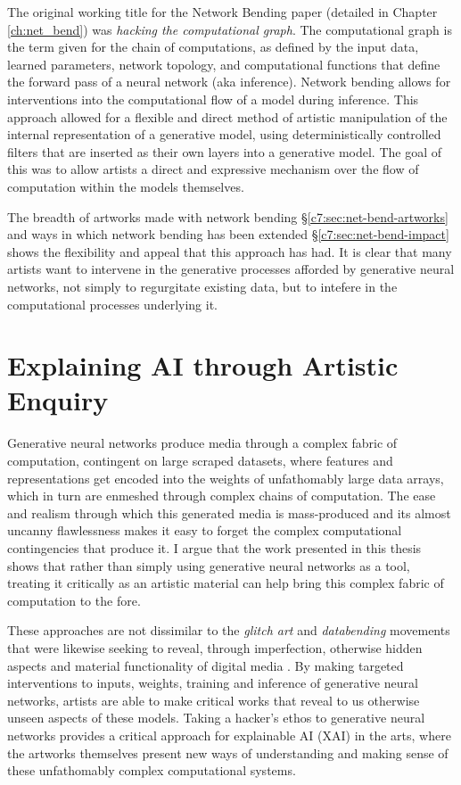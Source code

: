 The original working title for the Network Bending paper (detailed in Chapter \ref{ch:net_bend}) was \textit{hacking the computational graph}.
The computational graph is the term given for the chain of computations, as defined by the input data, learned parameters, network topology, and computational functions that define the forward pass of a neural network (aka inference). Network bending allows for interventions into the computational flow of a model during inference. 
This approach allowed for a flexible and direct method of artistic manipulation of the internal representation of a generative model, using deterministically controlled filters that are inserted as their own layers into a generative model.
The goal of this was to allow artists a direct and expressive mechanism over the flow of computation within the models themselves.

The breadth of artworks made with network bending \S \ref{c7:sec:net-bend-artworks} and ways in which network bending has been extended \S \ref{c7:sec:net-bend-impact} shows the flexibility and appeal that this approach has had.
It is clear that many artists want to intervene in the generative processes afforded by generative neural networks, not simply to regurgitate existing data, but to intefere in the computational processes underlying it.

\section{Explaining AI through Artistic Enquiry}
\label{c8:sec:explaining}

Generative neural networks produce media through a complex fabric of computation, contingent on large scraped datasets, where features and representations get encoded into the weights of unfathomably large data arrays, which in turn are enmeshed through complex chains of computation. 
The ease and realism through which this generated media is mass-produced and its almost uncanny flawlessness \citep{smith2023ai} makes it easy to forget the complex computational contingencies that produce it. 
I argue that the work presented in this thesis shows that rather than simply using generative neural networks as a tool, treating it critically as an artistic material can help bring this complex fabric of computation to the fore. 

These approaches are not dissimilar to the \textit{glitch art} and \textit{databending} movements that were likewise seeking to reveal, through imperfection, otherwise hidden aspects and material functionality of digital media \citep{kemper2023glitch}.
By making targeted interventions to inputs, weights, training and inference of generative neural networks, artists are able to make critical works that reveal to us otherwise unseen aspects of these models. 
Taking a hacker's ethos to generative neural networks provides a critical approach for explainable AI (XAI) in the arts,
where the artworks themselves present new ways of understanding and making sense of these unfathomably complex computational systems. 

